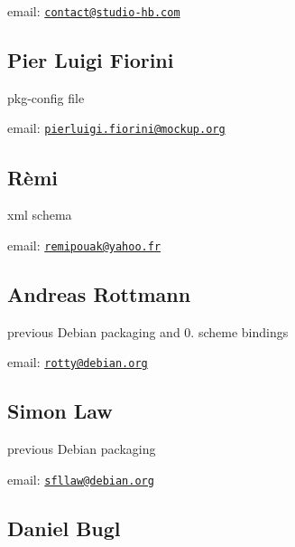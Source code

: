 \begin{DoxyItemize}
\item email\+: \href{mailto:contact@studio-hb.com}{\tt contact@studio-\/hb.\+com}
\end{DoxyItemize}

\subsection*{Pier Luigi Fiorini}

pkg-\/config file


\begin{DoxyItemize}
\item email\+: \href{mailto:pierluigi.fiorini@mockup.org}{\tt pierluigi.\+fiorini@mockup.\+org}
\end{DoxyItemize}

\subsection*{Rèmi}

xml schema


\begin{DoxyItemize}
\item email\+: \href{mailto:remipouak@yahoo.fr}{\tt remipouak@yahoo.\+fr}
\end{DoxyItemize}

\subsection*{Andreas Rottmann}

previous Debian packaging and 0. scheme bindings


\begin{DoxyItemize}
\item email\+: \href{mailto:rotty@debian.org}{\tt rotty@debian.\+org}
\end{DoxyItemize}

\subsection*{Simon Law}

previous Debian packaging


\begin{DoxyItemize}
\item email\+: \href{mailto:sfllaw@debian.org}{\tt sfllaw@debian.\+org}
\end{DoxyItemize}

\subsection*{Daniel Bugl}

